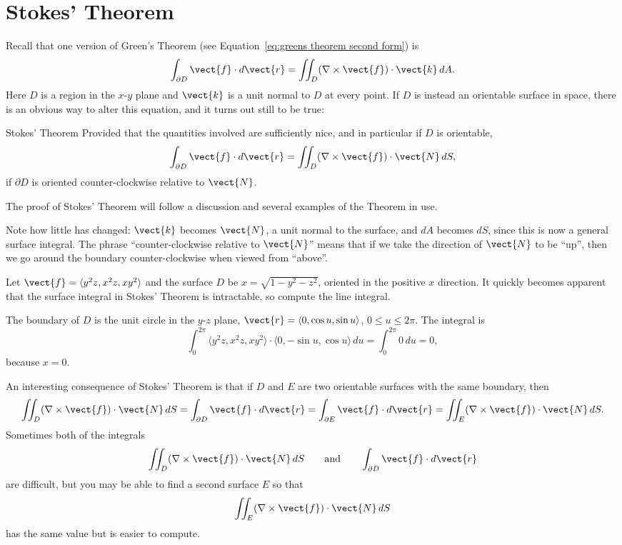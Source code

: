 \section{Stokes' Theorem}\label{sec:StokesTheorem}

Recall that one version of Green's Theorem (see
Equation~\ref{eq:greens theorem second form}) is
$$\int_{\partial D} \vect{f}\cdot d\vect{r}
=\iint_{D}(\nabla\times \vect{f})\cdot\vect{k}\,dA.
$$
Here $D$ is a region in the $x$-$y$ plane and $\vect{k}$ is a unit normal
to $D$ at every point. If $D$ is instead an orientable surface in
space, there is an obvious way to alter this equation, and it turns
out still to be true:

\begin{theorem}{Stokes' Theorem}{}
Provided that the quantities involved are
sufficiently nice, and in particular if $D$ is orientable, 
$$\int_{\partial D} \vect{f}\cdot d\vect{r}
=\iint_{D}(\nabla\times \vect{f})\cdot\vect{N}\,dS,$$
if $\partial D$ is oriented counter-clockwise relative to $\vect{N}$.
\end{theorem}

The proof of Stokes' Theorem will follow a discussion and several examples of the Theorem in use. 

Note how little has changed: $\vect{k}$ becomes $\vect{N}$, a unit normal to
the surface, and $dA$ becomes $dS$, since this is now a general
surface integral. The phrase ``counter-clockwise relative to $\vect{N}$''
means that if we take the direction of $\vect{N}$ to be ``up'', then we
go around the boundary counter-clockwise when viewed from ``above''.

\begin{example}{}{}
Let $\vect{f}=\langle  y^2z,x^2z,xy^2\rangle$ 
and the surface $D$ be $x=\sqrt{1-y^2-z^2}$, oriented in
the positive $x$ direction.
It quickly becomes apparent that the surface integral in Stokes'
Theorem is intractable, so compute the line integral.
\end{example}

\begin{solution}
The boundary of
$D$ is the unit circle in the $y$-$z$ plane, $\vect{r}=\langle 0,\cos
u,\sin u\rangle$, $0\le u\le 2\pi$. The integral is
$$\int_0^{2\pi} \langle  y^2z,x^2z,xy^2 \rangle\cdot
\langle 0,-\sin u,\cos u\rangle\,du=
\int_0^{2\pi} 0\,du = 0,$$
because $x=0$.
\end{solution}

An interesting consequence of Stokes' Theorem is that if $D$ and $E$
are two orientable surfaces with the same boundary, then
$$
\iint_{D}(\nabla\times \vect{f})\cdot\vect{N}\,dS
=\int_{\partial D} \vect{f}\cdot d\vect{r}
=\int_{\partial E} \vect{f}\cdot d\vect{r}
=\iint_{E}(\nabla\times \vect{f})\cdot\vect{N}\,dS.
$$
Sometimes both of the integrals 
$$\iint_{D}(\nabla\times \vect{f})\cdot\vect{N}\,dS
\qquad\hbox{and}\qquad\int_{\partial D} \vect{f}\cdot d\vect{r}$$
are difficult, but you may be able to find a second surface $E$ so
that
$$\iint_{E}(\nabla\times \vect{f})\cdot\vect{N}\,dS$$
has the same value but is easier to compute.

